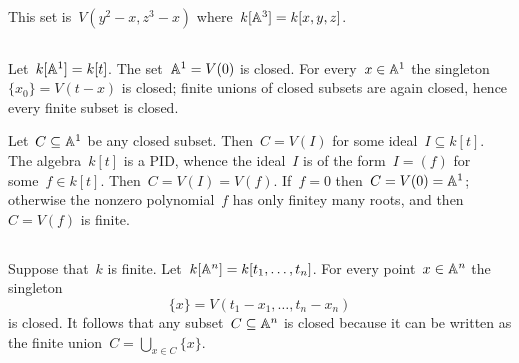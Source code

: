 \section{}





\subsection{}

This set is~$V(y^2 - x, z^3 - x)$ where~$k[\mathbb{A}^3] = k[x,y,z]$.





\subsection{}

Let~$k[\mathbb{A}^1] = k[t]$.
The set~$\mathbb{A}^1 = V(0)$ is closed.
For every~$x \in \mathbb{A}^1$ the singleton~$\{x_0\} = V(t - x)$ is closed;
finite unions of closed subsets are again closed, hence every finite subset is closed.

Let~$C \subseteq \mathbb{A}^1$ be any closed subset.
Then~$C = V(I)$ for some ideal~$I \subseteq k[t]$.
The algebra~$k[t]$ is a PID, whence the ideal~$I$ is of the form~$I = (f)$ for some~$f \in k[t]$.
Then~$C = V(I) = V(f)$.
If~$f = 0$ then~$C = V(0) = \mathbb{A}^1$;
otherwise the nonzero polynomial~$f$ has only finitey many roots, and then~$C = V(f)$ is finite.





\subsection{}

Suppose that~$k$ is finite.
Let~$k[\mathbb{A}^n] = k[t_1, \dotsc, t_n]$.
For every point~$x \in \mathbb{A}^n$ the singleton
\[
  \{x\}
  =
  V(t_1 - x_1, \dotsc, t_n - x_n)
\]
is closed.
It follows that any subset~$C \subseteq \mathbb{A}^n$ is closed because it can be written as the finite union~$C = \bigcup_{x \in C} \{x\}$.




